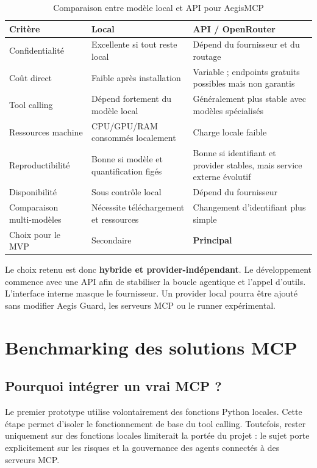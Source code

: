 \begin{table}[H]
\centering
\caption{Comparaison entre modèle local et API pour AegisMCP}
\label{tab:local-api}
\begin{tabularx}{\textwidth}{p{3.5cm} X X}
\toprule
\textbf{Critère} & \textbf{Local} & \textbf{API / OpenRouter} \\
\midrule
Confidentialité & Excellente si tout reste local & Dépend du fournisseur et du routage \\
Coût direct & Faible après installation & Variable ; endpoints gratuits possibles mais non garantis \\
Tool calling & Dépend fortement du modèle local & Généralement plus stable avec modèles spécialisés \\
Ressources machine & CPU/GPU/RAM consommés localement & Charge locale faible \\
Reproductibilité & Bonne si modèle et quantification figés & Bonne si identifiant et provider stables, mais service externe évolutif \\
Disponibilité & Sous contrôle local & Dépend du fournisseur \\
Comparaison multi-modèles & Nécessite téléchargement et ressources & Changement d'identifiant plus simple \\
Choix pour le MVP & Secondaire & \textbf{Principal} \\
\bottomrule
\end{tabularx}
\end{table}

Le choix retenu est donc \textbf{hybride et provider-indépendant}. Le développement commence avec une API afin de stabiliser la boucle agentique et l'appel d'outils. L'interface interne masque le fournisseur. Un provider local pourra être ajouté sans modifier Aegis Guard, les serveurs MCP ou le runner expérimental.

\section{Benchmarking des solutions MCP}

\subsection{Pourquoi intégrer un vrai MCP ?}

Le premier prototype utilise volontairement des fonctions Python locales. Cette étape permet d'isoler le fonctionnement de base du tool calling. Toutefois, rester uniquement sur des fonctions locales limiterait la portée du projet : le sujet porte explicitement sur les risques et la gouvernance des agents connectés à des serveurs MCP.

